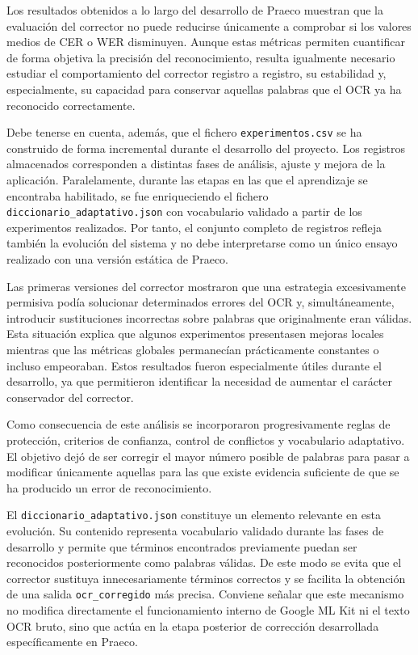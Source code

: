 Los resultados obtenidos a lo largo del desarrollo de Praeco muestran que la evaluación del corrector no puede reducirse únicamente a comprobar si los valores medios de CER o WER disminuyen. Aunque estas métricas permiten cuantificar de forma objetiva la precisión del reconocimiento, resulta igualmente necesario estudiar el comportamiento del corrector registro a registro, su estabilidad y, especialmente, su capacidad para conservar aquellas palabras que el OCR ya ha reconocido correctamente.

Debe tenerse en cuenta, además, que el fichero \texttt{experimentos.csv} se ha construido de forma incremental durante el desarrollo del proyecto. Los registros almacenados corresponden a distintas fases de análisis, ajuste y mejora de la aplicación. Paralelamente, durante las etapas en las que el aprendizaje se encontraba habilitado, se fue enriqueciendo el fichero \texttt{diccionario\_adaptativo.json} con vocabulario validado a partir de los experimentos realizados. Por tanto, el conjunto completo de registros refleja también la evolución del sistema y no debe interpretarse como un único ensayo realizado con una versión estática de Praeco.

Las primeras versiones del corrector mostraron que una estrategia excesivamente permisiva podía solucionar determinados errores del OCR y, simultáneamente, introducir sustituciones incorrectas sobre palabras que originalmente eran válidas. Esta situación explica que algunos experimentos presentasen mejoras locales mientras que las métricas globales permanecían prácticamente constantes o incluso empeoraban. Estos resultados fueron especialmente útiles durante el desarrollo, ya que permitieron identificar la necesidad de aumentar el carácter conservador del corrector.

Como consecuencia de este análisis se incorporaron progresivamente reglas de protección, criterios de confianza, control de conflictos y vocabulario adaptativo. El objetivo dejó de ser corregir el mayor número posible de palabras para pasar a modificar únicamente aquellas para las que existe evidencia suficiente de que se ha producido un error de reconocimiento.

El \texttt{diccionario\_adaptativo.json} constituye un elemento relevante en esta evolución. Su contenido representa vocabulario validado durante las fases de desarrollo y permite que términos encontrados previamente puedan ser reconocidos posteriormente como palabras válidas. De este modo se evita que el corrector sustituya innecesariamente términos correctos y se facilita la obtención de una salida \texttt{ocr\_corregido} más precisa. Conviene señalar que este mecanismo no modifica directamente el funcionamiento interno de Google ML Kit ni el texto OCR bruto, sino que actúa en la etapa posterior de corrección desarrollada específicamente en Praeco.


